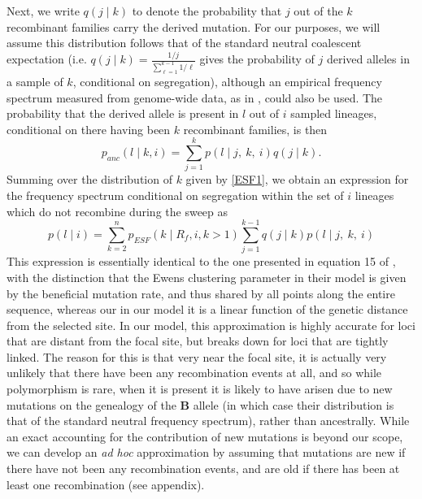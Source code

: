 \documentclass[a4paper,10pt]{article}
\begin{document}
Next, we write $q\left(j \mid k\right)$ to denote the probability that $j$ out of the $k$ recombinant families carry the derived mutation. For our purposes, we will assume this distribution follows that of the standard neutral coalescent expectation (i.e. $q(j \mid k) = \frac{1/j}{\sum_{\ell=1}^{k-1}1/\ell}$ gives the probability of $j$ derived alleles in a sample of $k$, conditional on segregation), although an empirical frequency spectrum measured from genome-wide data, as in \cite{Nielsen:2005bla}, could also be used. The probability that the derived allele is present in $l$ out of $i$ sampled lineages, conditional on there having been $k$ recombinant families, is then 
\begin{equation}
	p_{anc}(l \mid k, i ) = \sum_{j=1}^k p(l \mid j,~k, ~i)q(j\mid k).
\end{equation}	
Summing over the distribution of $k$ given by \eqref{ESF1}, we obtain an expression for the frequency spectrum conditional on segregation within the set of $i$ lineages which do not recombine during the sweep as
\begin{equation}
	p(l \mid i) =  \sum_{k=2}^{n}  p_{ESF}(k \mid R_f,i,k>1)  \sum_{j=1}^{k-1} q(j\mid k) p(l \mid j,~k, ~i) \label{no-sweep-rec-freq-spec}
\end{equation}
This expression is essentially identical to the one presented in equation 15 of \cite{Pennings2006}, with the distinction that the Ewens clustering parameter in their model is given by the beneficial mutation rate, and thus shared by all points along the entire sequence, whereas our in our model it is a linear function of the genetic distance from the selected site. In our model, this approximation is highly accurate for loci that are distant from the focal site, but breaks down for loci that are tightly linked. The reason for this is that very near the focal site, it is actually very unlikely that there have been any recombination events at all, and so while polymorphism is rare, when it is present it is likely to have arisen due to new mutations on the genealogy of the $\textbf{B}$ allele (in which case their distribution is that of the standard neutral frequency spectrum), rather than ancestrally. While an exact accounting for the contribution of new mutations is beyond our scope, we can develop an \textit{ad hoc} approximation by assuming that mutations are new if there have not been any recombination events, and are old if there has been at least one recombination (see appendix).
\end{document}
